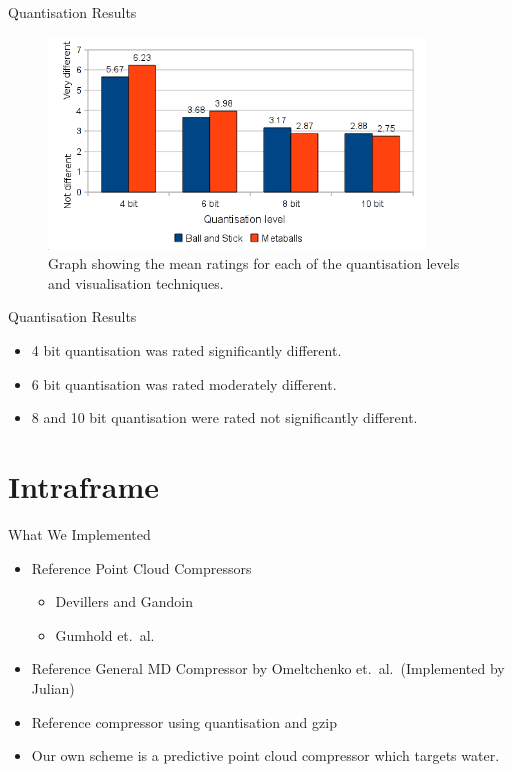 \documentclass{beamer}
\begin{document}
\begin{frame}{Quantisation Results}
\begin{figure}
  \centering
  \includegraphics[width=100mm]{min-images/bm-means.png}
  \caption{Graph showing the mean ratings for each of the quantisation levels and visualisation techniques.}
\end{figure}
\end{frame}

\begin{frame}{Quantisation Results}
\begin{itemize}

  \item 4 bit quantisation was rated significantly different.

  \item 6 bit quantisation was rated moderately different.

  \item 8 and 10 bit quantisation were rated not significantly different.

\end{itemize}
\end{frame}


\section{Intraframe}
\begin{frame}{What We Implemented}
  \begin{itemize}
    \item Reference Point Cloud Compressors
      \begin{itemize}
        \item Devillers and Gandoin
        \item Gumhold et.~al.
      \end{itemize}
    \item Reference General MD Compressor by Omeltchenko et.~al.~(Implemented
      by Julian)
    \item Reference compressor using quantisation and gzip
    \item Our own scheme is a predictive point cloud compressor which targets
      water.
  \end{itemize}
\end{frame}
\end{document}
